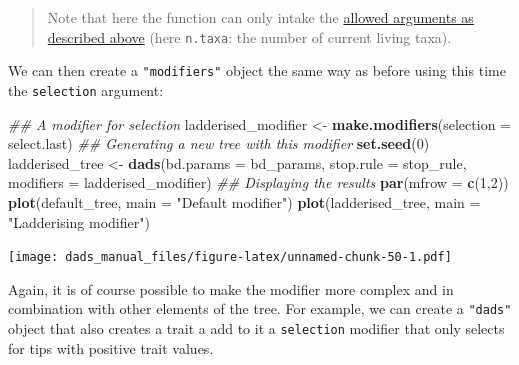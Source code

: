 \documentclass[]{book}
\newenvironment{Shaded}{\begin{snugshade}}{\end{snugshade}}
\newcommand{\CommentTok}[1]{\textcolor[rgb]{0.56,0.35,0.01}{\textit{#1}}}
\newcommand{\ControlFlowTok}[1]{\textcolor[rgb]{0.13,0.29,0.53}{\textbf{#1}}}
\newcommand{\DataTypeTok}[1]{\textcolor[rgb]{0.13,0.29,0.53}{#1}}
\newcommand{\DecValTok}[1]{\textcolor[rgb]{0.00,0.00,0.81}{#1}}
\newcommand{\KeywordTok}[1]{\textcolor[rgb]{0.13,0.29,0.53}{\textbf{#1}}}
\newcommand{\NormalTok}[1]{#1}
\newcommand{\OperatorTok}[1]{\textcolor[rgb]{0.81,0.36,0.00}{\textbf{#1}}}
\newcommand{\StringTok}[1]{\textcolor[rgb]{0.31,0.60,0.02}{#1}}
\begin{document}
\begin{Shaded}
\end{Shaded}

\begin{quote}
Note that here the function can only intake the \protect\hyperlink{allowarguments}{allowed arguments as described above} (here \texttt{n.taxa}: the number of current living taxa).
\end{quote}

We can then create a \texttt{"modifiers"} object the same way as before using this time the \texttt{selection} argument:

\begin{Shaded}
\begin{Highlighting}[]
\CommentTok{## A modifier for selection}
\NormalTok{ladderised_modifier <-}\StringTok{ }\KeywordTok{make.modifiers}\NormalTok{(}\DataTypeTok{selection =}\NormalTok{ select.last)}
\CommentTok{## Generating a new tree with this modifier}
\KeywordTok{set.seed}\NormalTok{(}\DecValTok{0}\NormalTok{)}
\NormalTok{ladderised_tree <-}\StringTok{ }\KeywordTok{dads}\NormalTok{(}\DataTypeTok{bd.params =}\NormalTok{ bd_params,}
                        \DataTypeTok{stop.rule =}\NormalTok{ stop_rule,}
                        \DataTypeTok{modifiers =}\NormalTok{ ladderised_modifier)}
\CommentTok{## Displaying the results}
\KeywordTok{par}\NormalTok{(}\DataTypeTok{mfrow =} \KeywordTok{c}\NormalTok{(}\DecValTok{1}\NormalTok{,}\DecValTok{2}\NormalTok{))}
\KeywordTok{plot}\NormalTok{(default_tree,    }\DataTypeTok{main =} \StringTok{"Default modifier"}\NormalTok{)}
\KeywordTok{plot}\NormalTok{(ladderised_tree, }\DataTypeTok{main =} \StringTok{"Ladderising modifier"}\NormalTok{)}
\end{Highlighting}
\end{Shaded}

\texttt{[image: dads\_manual\_files/figure-latex/unnamed-chunk-50-1.pdf]}

Again, it is of course possible to make the modifier more complex and in combination with other elements of the tree.
For example, we can create a \texttt{"dads"} object that also creates a trait a add to it a \texttt{selection} modifier that only selects for tips with positive trait values.
\end{document}
